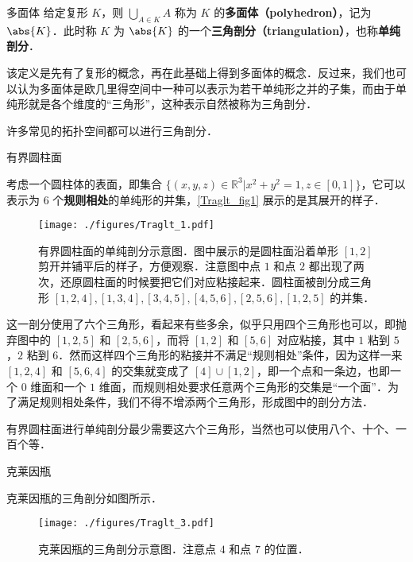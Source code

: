 

\begin{definition}{多面体}
给定复形 $K$，则 $\bigcup\limits_{A\in K}A$ 称为 $K$ 的\textbf{多面体（polyhedron）}，记为 $\abs{K}$．此时称 $K$ 为 $\abs{K}$ 的一个\textbf{三角剖分（triangulation）}，也称\textbf{单纯剖分}．
\end{definition}

该定义是先有了复形的概念，再在此基础上得到多面体的概念．反过来，我们也可以认为多面体是欧几里得空间中一种可以表示为若干单纯形之并的子集，而由于单纯形就是各个维度的“三角形”，这种表示自然被称为三角剖分．

许多常见的拓扑空间都可以进行三角剖分．

\begin{example}{有界圆柱面}

考虑一个圆柱体的表面，即集合 $\{(x, y, z)\in\mathbb{R}^3|x^2+y^2=1, z\in [0, 1]\}$，它可以表示为 $6$ 个\textbf{规则相处}的单纯形的并集，\autoref{Traglt_fig1} 展示的是其展开的样子．


\begin{figure}[ht]
\centering
\texttt{[image: ./figures/Traglt\_1.pdf]}
\caption{有界圆柱面的单纯剖分示意图．图中展示的是圆柱面沿着单形 $[1, 2]$ 剪开并铺平后的样子，方便观察．注意图中点 $1$ 和点 $2$ 都出现了两次，还原圆柱面的时候要把它们对应粘接起来．圆柱面被剖分成三角形 $[1,2,4], [1,3,4], [3,4,5], [4,5,6], [2,5,6], [1,2,5]$ 的并集．} \label{Traglt_fig1}
\end{figure}


这一剖分使用了六个三角形，看起来有些多余，似乎只用四个三角形也可以，即抛弃图中的 $[1,2,5]$ 和 $[2,5,6]$，而将 $[1, 2]$ 和 $[5, 6]$ 对应粘接，其中 $1$ 粘到 $5$，$2$ 粘到 $6$．然而这样四个三角形的粘接并不满足“规则相处”条件，因为这样一来 $[1, 2, 4]$ 和 $[5, 6, 4]$ 的交集就变成了 $[4]\cup[1, 2]$，即一个点和一条边，也即一个 $0$ 维面和一个 $1$ 维面，而规则相处要求任意两个三角形的交集是“一个面”．为了满足规则相处条件，我们不得不增添两个三角形，形成图中的剖分方法．



有界圆柱面进行单纯剖分最少需要这六个三角形，当然也可以使用八个、十个、一百个等．

\end{example}


\begin{example}{克莱因瓶}

克莱因瓶的三角剖分如图所示．

\begin{figure}[ht]
\centering
\texttt{[image: ./figures/Traglt\_3.pdf]}
\caption{克莱因瓶的三角剖分示意图．注意点 $4$ 和点 $7$ 的位置．} \label{Traglt_fig3}
\end{figure}

\end{example}


